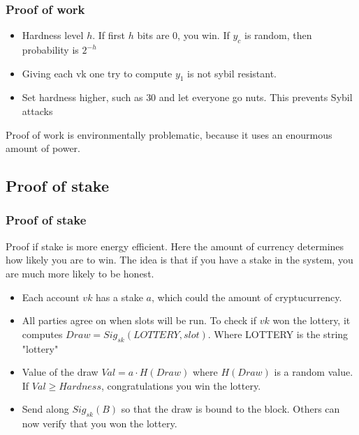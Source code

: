    \begin{frame}
        \frametitle{Proof of work}
            \begin{itemize}
                \item Hardness level $h$. If first $h$ bits are $0$, you win. If $y_c$ is random, then probability is $2^{-h}$ 
                \item Giving each vk one try to compute $y_1$ is not sybil resistant. 
                \item Set hardness higher, such as $30$ and let everyone go nuts. This prevents Sybil attacks
            \end{itemize}
            Proof of work is environmentally problematic, because it uses an enourmous amount of power. 
    \end{frame}

    \subsection{Proof of stake}
        \begin{frame}
            \frametitle{Proof of stake}
                Proof if stake is more energy efficient. Here the amount of currency determines how likely you are to win. The idea is that if you have a stake in the system, you are much more likely to be honest. 
                \begin{itemize}
                   \item Each account $vk$ has a stake $a$, which could the amount of cryptucurrency. 
                   \item All parties agree on when slots will be run. To check if $vk$ won the lottery, it computes $Draw = Sig_{sk}(LOTTERY, slot)$. Where LOTTERY is the string "lottery"
                   \item Value of the draw $Val = a \cdot H(Draw)$ where $H(Draw)$ is a random value. If $Val \geq Hardness$, congratulations you win the lottery. 
                   \item Send along $Sig_{sk}(B)$ so that the draw is bound to the block. Others can now verify that you won the lottery.  
                \end{itemize}
        
        \end{frame}

